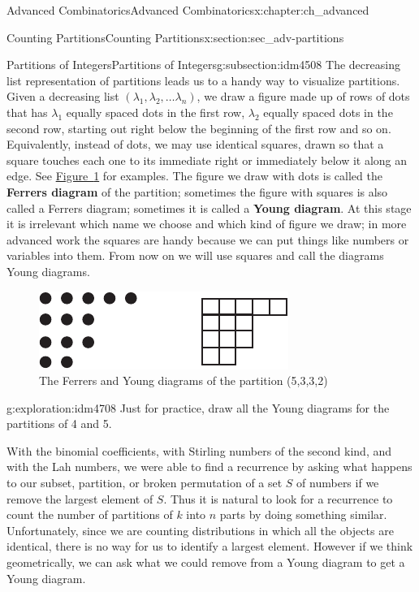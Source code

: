 \documentclass[oneside,10pt,]{book}
\newcommand{\terminology}[1]{\textbf{#1}}
\numberwithin{equation}{chapter}
\begin{document}
\begin{chapterptx}{Advanced Combinatorics}{}{Advanced Combinatorics}{}{}{x:chapter:ch_advanced}
\begin{sectionptx}{Counting Partitions}{}{Counting Partitions}{}{}{x:section:sec_adv-partitions}
\begin{subsectionptx}{Partitions of Integers}{}{Partitions of Integers}{}{}{g:subsection:idm4508}
The decreasing list representation of partitions leads us to a handy way to visualize partitions. Given a decreasing list \((\lambda_1,\lambda_2,\ldots \lambda_n)\), we draw a figure made up of rows of dots that has \(\lambda_1\) equally spaced dots in the first row, \(\lambda_2\) equally spaced dots in the second row, starting out right below the beginning of the first row and so on. Equivalently, instead of dots, we may use identical squares, drawn so that a square touches each one to its immediate right or immediately below it along an edge. See \hyperref[x:figure:FerrersYoung]{Figure~\ref{x:figure:FerrersYoung}} for examples. The figure we draw with dots is called the \terminology{Ferrers diagram} of the partition; sometimes the figure with squares is also called a Ferrers diagram; sometimes it is called a \terminology{Young diagram}. At this stage it is irrelevant which name we choose and which kind of figure we draw; in more advanced work the squares are handy because we can put things like numbers or variables into them.  From now on we will use squares and call the diagrams Young diagrams.%
\begin{figure}
\centering
\includegraphics[width=0.45\linewidth]{images/FerrersYoung}
\caption{The Ferrers and Young diagrams of the partition (5,3,3,2)\label{x:figure:FerrersYoung}}
\end{figure}
\begin{exploration}{}{g:exploration:idm4708}%
Just for practice, draw all the Young diagrams for the partitions of 4 and 5.%
\end{exploration}
With the binomial coefficients, with Stirling numbers of the second kind, and with the Lah numbers, we were able to find a recurrence by asking what happens to our subset, partition, or broken permutation of a set \(S\) of numbers if we remove the largest element of \(S\). Thus it is natural to look for a recurrence to count the number of partitions of \(k\) into \(n\) parts by doing something similar. Unfortunately, since we are counting distributions in which all the objects are identical, there is no way for us to identify a largest element. However if we think geometrically, we can ask what we could remove from a Young diagram to get a Young diagram.%

\end{subsectionptx}
\end{sectionptx}
\end{chapterptx}
\end{document}

